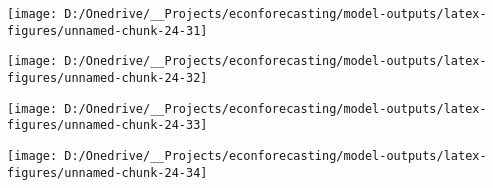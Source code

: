 \documentclass[11pt, letterpaper]{article}\usepackage[]{graphicx}\usepackage[]{color}
\begin{document}
{\centering \texttt{[image: D:/Onedrive/\_\_Projects/econforecasting/model-outputs/latex-figures/unnamed-chunk-24-31]} 

}




{\centering \texttt{[image: D:/Onedrive/\_\_Projects/econforecasting/model-outputs/latex-figures/unnamed-chunk-24-32]} 

}




{\centering \texttt{[image: D:/Onedrive/\_\_Projects/econforecasting/model-outputs/latex-figures/unnamed-chunk-24-33]} 

}




{\centering \texttt{[image: D:/Onedrive/\_\_Projects/econforecasting/model-outputs/latex-figures/unnamed-chunk-24-34]} 

}
\end{document}
